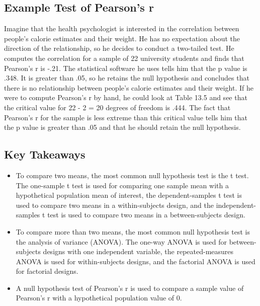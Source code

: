\subsection{Example Test of Pearson's r}

Imagine that the health psychologist is interested in the correlation between people's calorie estimates and their weight. He has no expectation about the direction of the relationship, so he decides to conduct a two-tailed test. He computes the correlation for a sample of 22 university students and finds that Pearson's r is -.21. The statistical software he uses tells him that the p value is .348. It is greater than .05, so he retains the null hypothesis and concludes that there is no relationship between people's calorie estimates and their weight. If he were to compute Pearson's r by hand, he could look at Table 13.5 and see that the critical value for 22 - 2 = 20 degrees of freedom is .444. The fact that Pearson's r for the sample is less extreme than this critical value tells him that the p value is greater than .05 and that he should retain the null hypothesis.


\subsection{Key Takeaways}
\begin{fullwidth}
\begin{itemize}
\item To compare two means, the most common null hypothesis test is the t test. The one-sample t test is used for comparing one sample mean with a hypothetical population mean of interest, the dependent-samples t test is used to compare two means in a within-subjects design, and the independent-samples t test is used to compare two means in a between-subjects design.

\item To compare more than two means, the most common null hypothesis test is the analysis of variance (ANOVA). The one-way ANOVA is used for between-subjects designs with one independent variable, the repeated-measures ANOVA is used for within-subjects designs, and the factorial ANOVA is used for factorial designs.

\item A null hypothesis test of Pearson's r is used to compare a sample value of Pearson's r with a hypothetical population value of 0.

\end{itemize}
\end{fullwidth}




